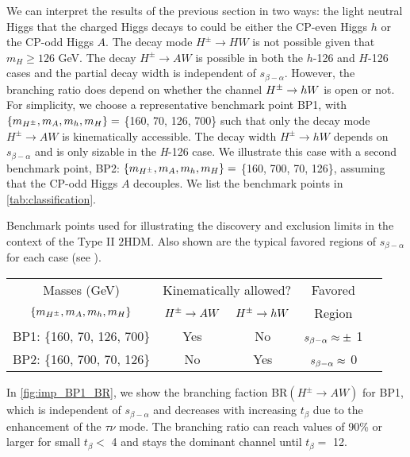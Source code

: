 We can interpret the results of the previous section in two ways: the light neutral Higgs that the charged Higgs decays to could be either the CP-even Higgs $h$ or the CP-odd Higgs $A$. The decay mode $H^{\pm} \rightarrow HW$ is not possible given that $m_{H}\geq 126$ GeV. The decay $H^{\pm} \rightarrow AW$ is possible in both the $h$-126 and $H$-126 cases and the partial decay width is independent of $s_{\beta-\alpha}$. However, the branching ratio does depend on whether the channel $H^{\pm} \rightarrow h W$ is open or not. For simplicity, we choose a representative benchmark point BP1, with $\left\{ {m_{H^{\pm}},m_{A},m_{h},m_{H}}\right\}=$ \{160, 70, 126, 700\} such that only the decay mode $H^{\pm} \rightarrow AW$ is kinematically accessible. The decay width $H^{\pm} \rightarrow h W$ depends on $s_{\beta-\alpha}$ and is only sizable in the \emph{H}-126 case. We illustrate this case with a second benchmark point, BP2: $\left\{ {m_{H^{\pm}},m_{A},m_{h},m_{H}}\right\}=$ \{160, 700, 70, 126\}, assuming that the CP-odd Higgs $A$ decouples. We list the benchmark points in \autoref{tab:classification}. 

\begin{table}
  \begin{sidecaption}{Benchmark points used for illustrating the discovery and exclusion limits in the context of the Type II $2$HDM. Also shown are the typical favored regions of $s_{\beta-\alpha}$ for each case (see \cite{Coleppa:2013dya}). } 
\begin{center}
 \begin{tabular}{ccccl}
 \toprule
 Masses (GeV) & \multicolumn{2}{c}{Kinematically allowed?} & Favored\\ \cmidrule{2-3}
 $\left\{ {m_{H^{\pm}},m_{A},m_{h},m_{H}}\right\}$ & $H^{\pm}\rightarrow A W$ & $H^{\pm}\rightarrow h W$ & Region\\\midrule
  BP1: \{160, 70, 126, 700\} & Yes & No & $s_{\beta-\alpha}\approx\pm$ 1 \\ \midrule
 BP2: \{160, 700, 70, 126\} & No & Yes & $s_{\beta-\alpha}\approx$ 0 \\
 \bottomrule
 \end{tabular}
\end{center}
\end{sidecaption}
\label{tab:classification}
\end{table}


In \autoref{fig:imp_BP1_BR}, we show the branching faction BR$(H^{\pm} \rightarrow AW)$ for BP1, which is independent of $s_{\beta-\alpha}$ and decreases with increasing $t_{\beta}$ due to the enhancement of the $\tau\nu$ mode. The branching ratio can reach values of 90\% or larger for small $t_{\beta}<$ 4 and stays the dominant channel until $t_{\beta}=$ 12. 

